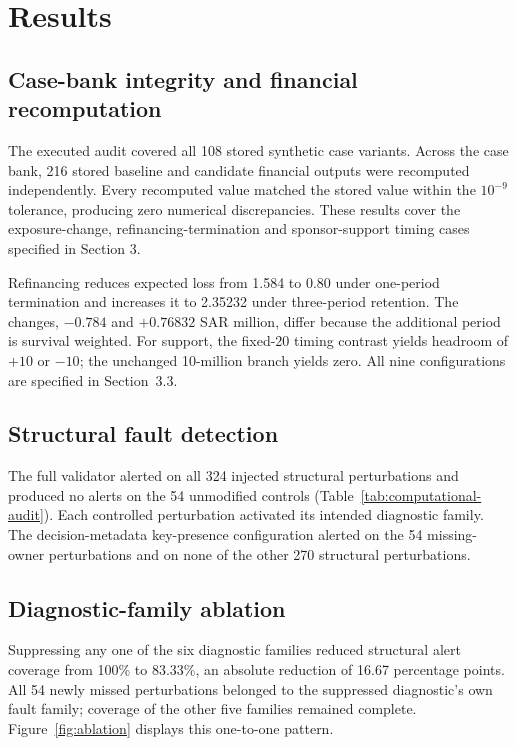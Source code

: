 \documentclass[11pt,a4paper]{article}
\begin{document}
\section{Results}

\subsection{Case-bank integrity and financial recomputation}

The executed audit covered all 108 stored synthetic case variants. Across the case bank, 216 stored baseline and candidate financial outputs were recomputed independently. Every recomputed value matched the stored value within the $10^{-9}$ tolerance, producing zero numerical discrepancies. These results cover the exposure-change, refinancing-termination and sponsor-support timing cases specified in Section 3.



Refinancing reduces expected loss from 1.584 to 0.80 under one-period termination and increases it to 2.35232 under three-period retention. The changes, $-0.784$ and $+0.76832$ SAR million, differ because the additional period is survival weighted. For support, the fixed-20 timing contrast yields headroom of $+10$ or $-10$; the unchanged 10-million branch yields zero. All nine configurations are specified in Section~3.3.

\subsection{Structural fault detection}

The full validator alerted on all 324 injected structural perturbations and produced no alerts on the 54 unmodified controls (Table~\ref{tab:computational-audit}). Each controlled perturbation activated its intended diagnostic family. The decision-metadata key-presence configuration alerted on the 54 missing-owner perturbations and on none of the other 270 structural perturbations.

\subsection{Diagnostic-family ablation}

Suppressing any one of the six diagnostic families reduced structural alert coverage from 100\% to 83.33\%, an absolute reduction of 16.67 percentage points. All 54 newly missed perturbations belonged to the suppressed diagnostic's own fault family; coverage of the other five families remained complete. Figure~\ref{fig:ablation} displays this one-to-one pattern.
\end{document}
